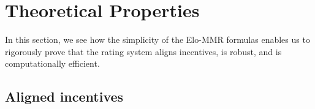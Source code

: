 \section{Theoretical Properties}
\label{sec:properties}
In this section, we see how the simplicity of the Elo-MMR formulas enables us to rigorously prove that the rating system aligns incentives, is robust, and is computationally efficient.

\vspace{-.6em}
\subsection{Aligned incentives}
\label{sec:mono}




